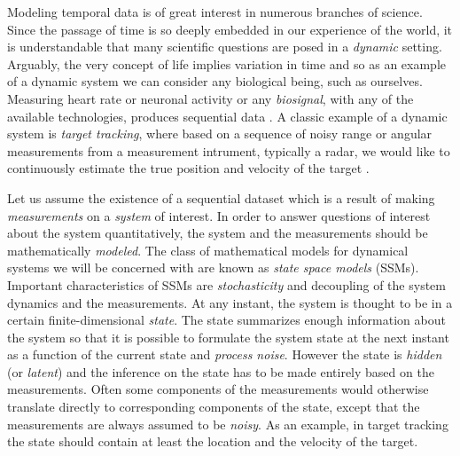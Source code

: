 Modeling temporal data is of great interest in numerous branches of science.
Since the passage of time is so deeply embedded in our experience of the world, 
it is understandable that many scientific questions are posed in a \emph{dynamic}
setting. Arguably, the very concept of life implies variation in time and so 
as an example of a dynamic system we can consider any biological being, such as ourselves.
Measuring heart rate or neuronal activity or any \emph{biosignal}, 
with any of the available technologies,
produces sequential data \parencite[see, e.g.,][for a recent application]{Sarkka2012}. A
classic example of a dynamic
system is \emph{target tracking}, where based on a sequence of 
noisy range or angular measurements from a measurement intrument, typically a radar, 
we would like to continuously 
estimate the true position and velocity of the target \parencite{bar2004estimation,Godsill2007}. 


Let us assume the existence of a sequential dataset which is a result of 
making \emph{measurements} on a \emph{system} of interest. In order to answer questions of interest
about the system quantitatively,
the system and the measurements should be mathematically \emph{modeled}. The class of mathematical
models for dynamical systems we will be concerned with are known as \emph{state space models} (SSMs).
Important characteristics of SSMs are \emph{stochasticity} and decoupling of the system dynamics and the
measurements. At any instant, the system is thought to be in a certain finite-dimensional \emph{state}. The state
summarizes enough information about the system so that it is possible to formulate the system
state at the next instant as a function of the current state and \emph{process noise}.  
However the state is \emph{hidden} (or \emph{latent}) and the inference on the state has 
to be made entirely based on the measurements.  Often some components of the measurements 
would otherwise translate directly to corresponding components of the state, except that 
the measurements are always assumed to be \emph{noisy}.
As an example, in target tracking the state should contain at least the location and 
the velocity of the target. 

